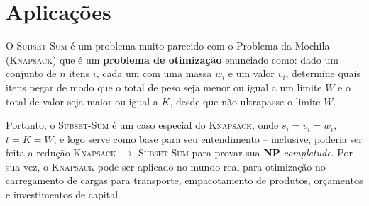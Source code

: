 \section{Aplicações}

O \textsc{Subset-Sum} é um problema muito parecido com o Problema da Mochila (\textsc{Knapsack}) que é um \textbf{problema de otimização} enunciado como: dado um conjunto de $n$ itens $i$, cada um com uma massa $w_i$ e um valor $v_i$, determine quais itens pegar de modo que o total de peso seja menor ou igual a um limite $W$ e o total de valor seja maior ou igual a $K$, desde que não ultrapasse o limite $W$.

Portanto, o \textsc{Subset-Sum} é um caso especial do \textsc{Knapsack}, onde $s_i = v_i = w_i$, $t = K = W$, e logo serve como base para seu entendimento -- inclusive, poderia ser feita a redução \textsc{Knapsack} $\rightarrow$ \textsc{Subset-Sum} para provar sua \textbf{NP}-\textit{completude}. Por sua vez, o \textsc{Knapsack} pode ser aplicado no mundo real para otimização no carregamento de cargas para transporte, empacotamento de produtos, orçamentos e investimentos de capital.



